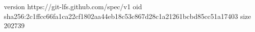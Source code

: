 version https://git-lfs.github.com/spec/v1
oid sha256:2c1ffcc66fa1ca22cf1802aa44eb18c53c867d28c1a21261bcbd85cc51a17403
size 202739

